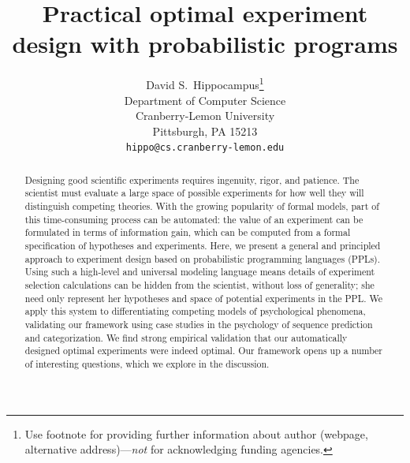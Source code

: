 \documentclass{article}
\title{Practical optimal experiment design with probabilistic programs}
\author{
  David S.~Hippocampus\thanks{Use footnote for providing further
    information about author (webpage, alternative
    address)---\emph{not} for acknowledging funding agencies.} \\
  Department of Computer Science\\
  Cranberry-Lemon University\\
  Pittsburgh, PA 15213 \\
  \texttt{hippo@cs.cranberry-lemon.edu} \\
}
\newcommand{\mht}[1]{\textcolor{Blue}{[mht: #1]}}
\begin{document}

\maketitle

\begin{abstract}

Designing good scientific experiments requires ingenuity, rigor, and patience. %
The scientist must evaluate a large space of possible experiments for how well they will distinguish competing theories.
With the growing popularity of formal models, part of this time-consuming process can be automated: the value of an experiment can be formulated in terms of information gain, which can be computed from a formal specification of hypotheses and experiments.
Here, we present a general and principled approach to experiment design based on probabilistic programming languages (PPLs).
Using such a high-level and universal modeling language means details of experiment selection calculations can be hidden from the scientist, without loss of generality; she need only represent her hypotheses and space of potential experiments in the PPL.
We apply this system to differentiating competing models of psychological phenomena, validating our framework using case studies in the psychology of sequence prediction and categorization.
We find strong empirical validation that our automatically designed optimal experiments were indeed optimal.
Our framework opens up a number of interesting questions, which we explore in the discussion.


\end{abstract}

\end{document}
